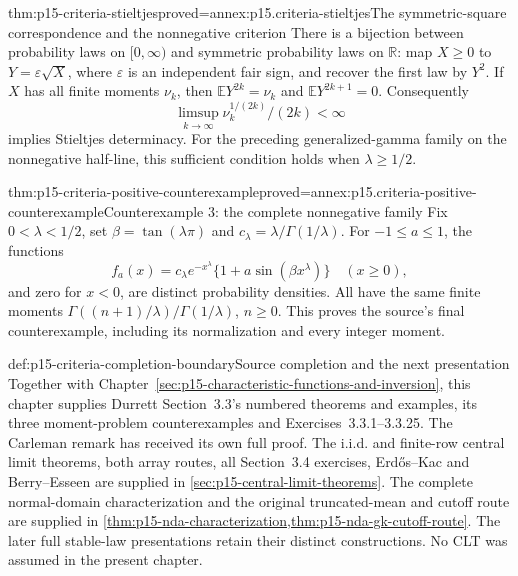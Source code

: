 \begin{hbtheorem}{thm:p15-criteria-stieltjes}{proved=annex:p15.criteria-stieltjes}{The symmetric-square correspondence and the nonnegative criterion}
There is a bijection between probability laws on
\([0,\infty)\) and symmetric probability laws on \(\mathbb R\):
map \(X\geq0\) to \(Y=\varepsilon\sqrt X\), where
\(\varepsilon\) is an independent fair sign, and recover
the first law by \(Y^2\).
If \(X\) has all finite moments \(\nu_k\), then
\(\mathbb EY^{2k}=\nu_k\) and \(\mathbb EY^{2k+1}=0\).
Consequently
\[
 \limsup_{k\to\infty}\nu_k^{1/(2k)}/(2k)<\infty
\]
implies Stieltjes determinacy.
For the preceding generalized-gamma family on the
nonnegative half-line, this sufficient condition holds
when \(\lambda\geq1/2\).
\end{hbtheorem}

\begin{hbtheorem}{thm:p15-criteria-positive-counterexample}{proved=annex:p15.criteria-positive-counterexample}{Counterexample 3: the complete nonnegative family}
Fix \(0<\lambda<1/2\), set
\(\beta=\tan(\lambda\pi)\) and
\(c_\lambda=\lambda/\Gamma(1/\lambda)\).
For \(-1\leq a\leq1\), the functions
\[
 f_a(x)=c_\lambda e^{-x^\lambda}
                     \{1+a\sin(\beta x^\lambda)\}
                    \quad(x\geq0),
\]
and zero for \(x<0\), are distinct probability densities.
All have the same finite moments
\(\Gamma((n+1)/\lambda)/\Gamma(1/\lambda)\), \(n\geq0\).
This proves the source's final counterexample, including
its normalization and every integer moment.
\end{hbtheorem}

\begin{proofboundary}{def:p15-criteria-completion-boundary}{Source completion and the next presentation}
Together with Chapter~\ref{sec:p15-characteristic-functions-and-inversion},
this chapter supplies Durrett Section~3.3's numbered
theorems and examples, its three moment-problem counterexamples
and Exercises~3.3.1--3.3.25.
The Carleman remark has received its own full proof.
The i.i.d. and finite-row central limit theorems, both array routes,
all Section~3.4 exercises, Erd\H{o}s--Kac and Berry--Esseen are supplied
in \cref{sec:p15-central-limit-theorems}.
The complete normal-domain characterization and the original
truncated-mean and cutoff route are supplied in
\cref{thm:p15-nda-characterization,thm:p15-nda-gk-cutoff-route}.
The later full stable-law presentations retain their distinct
constructions.
No CLT was assumed in the present chapter.
\end{proofboundary}
